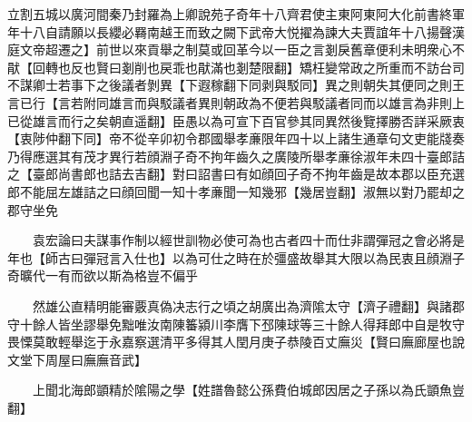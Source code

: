 立割五城以廣河間秦乃封羅為上卿說苑子奇年十八齊君使主東阿東阿大化前書終軍年十八自請願以長纓必羇南越王而致之闕下武帝大悦擢為諫大夫賈誼年十八揚聲漢庭文帝超遷之】前世以來貢舉之制莫或回革今以一臣之言剗戾舊章便利未明衆心不猒【回轉也反也賢曰剗削也戻乖也猒滿也剗楚限翻】矯枉變常政之所重而不訪台司不謀卿士若事下之後議者剝異【下遐稼翻下同剥與駁同】異之則朝失其便同之則王言已行【言若附同雄言而與駁議者異則朝政為不便若與駁議者同而以雄言為非則上已從雄言而行之矣朝直遥翻】臣愚以為可宣下百官參其同異然後覽擇勝否詳采厥衷【衷陟仲翻下同】帝不從辛卯初令郡國舉孝亷限年四十以上諸生通章句文吏能牋奏乃得應選其有茂才異行若顔淵子奇不拘年齒久之廣陵所舉孝亷徐淑年未四十臺郎詰之【臺郎尚書郎也詰去吉翻】對曰詔書曰有如顔回子奇不拘年齒是故本郡以臣充選郎不能屈左雄詰之曰顔回聞一知十孝亷聞一知幾邪【幾居豈翻】淑無以對乃罷却之郡守坐免

　　袁宏論曰夫謀事作制以經世訓物必使可為也古者四十而仕非謂彈冠之會必將是年也【師古曰彈冠言入仕也】以為可仕之時在於彊盛故舉其大限以為民衷且顔淵子奇曠代一有而欲以斯為格豈不偏乎

　　然雄公直精明能審覈真偽决志行之頃之胡廣出為濟隂太守【濟子禮翻】與諸郡守十餘人皆坐謬舉免黜唯汝南陳䉒潁川李膺下邳陳球等三十餘人得拜郎中自是牧守畏慄莫敢輕舉迄于永嘉察選清平多得其人閏月庚子恭陵百丈廡災【賢曰廡廊屋也說文堂下周屋曰廡廡音武】

　　上聞北海郎顗精於隂陽之學【姓譜魯懿公孫費伯城郎因居之子孫以為氏顗魚豈翻】

